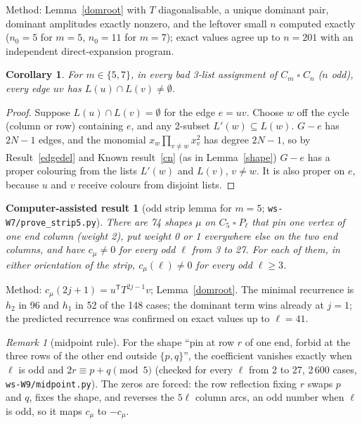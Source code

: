 \documentclass[11pt]{article}
\theoremstyle{plain}
\newtheorem{corollary}[theorem]{Corollary}
\newtheorem{computed}[theorem]{Computer-assisted result}
\theoremstyle{definition}
\theoremstyle{remark}
\newtheorem{remark}[theorem]{Remark}
\newcommand{\T}{\mathbin{\square}}
\newcommand{\script}[1]{\texttt{#1}}
\begin{document}
Method: Lemma~\ref{domroot} with $T$ diagonalisable, a unique dominant pair, dominant amplitudes exactly nonzero, and the
leftover small $n$ computed exactly ($n_0 = 5$ for $m = 5$, $n_0 = 11$ for $m = 7$); exact values agree up to $n = 201$ with
an independent direct-expansion program.

\begin{corollary}\label{overlap}
For $m \in \{5, 7\}$, in every bad 3-list assignment of $C_m \T C_n$ ($n$ odd), every edge $uv$ has $L(u) \cap L(v) \ne \emptyset$.
\end{corollary}

\begin{proof}
Suppose $L(u) \cap L(v) = \emptyset$ for the edge $e = uv$. Choose $w$ off the cycle (column or row) containing $e$, and any 2-subset
$L'(w) \subseteq L(w)$. $G - e$ has $2N - 1$ edges, and the monomial $x_w \prod_{v \ne w} x_v^2$ has degree $2N - 1$, so by
Result~\ref{edgedel} and Known result~\ref{cn} (as in Lemma~\ref{shape}) $G - e$ has a proper colouring from the lists
$L'(w)$ and $L(v)$, $v \ne w$. It is also proper on $e$, because $u$ and $v$ receive colours from disjoint lists.
\end{proof}

\begin{computed}[odd strip lemma for $m = 5$; \script{ws-W7/prove\_strip5.py}]\label{strip5}
There are 74 shapes $\mu$ on $C_5 \T P_\ell$ that pin one vertex of one end column (weight 2), put weight 0 or 1 everywhere else
on the two end columns, and have $c_\mu \ne 0$ for every odd $\ell$ from 3 to 27. For each of them, in either orientation of
the strip, $c_\mu(\ell) \ne 0$ for \emph{every} odd $\ell \ge 3$.
\end{computed}

Method: $c_\mu(2j + 1) = u^{\mathsf T} T^{2j-1} v$; Lemma~\ref{domroot}. The minimal recurrence is $h_2$ in 96 and $h_1$ in 52 of
the 148 cases; the dominant term wins already at $j = 1$; the predicted recurrence was confirmed on exact values up to
$\ell = 41$.

\begin{remark}[midpoint rule]
For the shape ``pin at row $r$ of one end, forbid at the three rows of the other end outside $\{p, q\}$'', the coefficient
vanishes exactly when $\ell$ is odd and $2r \equiv p + q \pmod 5$ (checked for every $\ell$ from 2 to 27, 2\,600 cases,
\script{ws-W9/midpoint.py}). The zeros are forced: the row reflection fixing $r$ swaps $p$ and $q$, fixes the shape, and
reverses the $5\ell$ column arcs, an odd number when $\ell$ is odd, so it maps $c_\mu$ to $-c_\mu$.
\end{remark}
\end{document}
